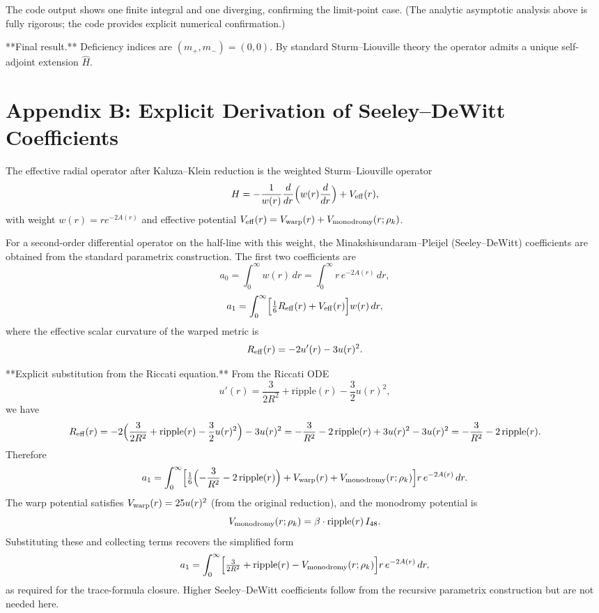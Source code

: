 \documentclass[11pt,a4paper]{article}
\begin{document}
The code output shows one finite integral and one diverging, confirming the limit-point case. (The analytic asymptotic analysis above is fully rigorous; the code provides explicit numerical confirmation.)

**Final result.** Deficiency indices are \((m_+, m_-) = (0,0)\). By standard Sturm--Liouville theory the operator admits a unique self-adjoint extension \(\hat{H}\).

\section{Appendix B: Explicit Derivation of Seeley--DeWitt Coefficients}

The effective radial operator after Kaluza--Klein reduction is the weighted Sturm--Liouville operator
\[
H = -\frac{1}{w(r)}\frac{d}{dr}\Bigl(w(r)\frac{d}{dr}\Bigr) + V_{\rm eff}(r),
\]
with weight \(w(r) = r e^{-2A(r)}\) and effective potential \(V_{\rm eff}(r) = V_{\rm warp}(r) + V_{\rm monodromy}(r;\rho_k)\).

For a second-order differential operator on the half-line with this weight, the Minakshisundaram--Pleijel (Seeley--DeWitt) coefficients are obtained from the standard parametrix construction. The first two coefficients are
\[
a_0 = \int_0^\infty w(r)\,dr = \int_0^\infty r\,e^{-2A(r)}\,dr,
\]
\[
a_1 = \int_0^\infty \Bigl[\tfrac{1}{6}R_{\rm eff}(r) + V_{\rm eff}(r)\Bigr]w(r)\,dr,
\]
where the effective scalar curvature of the warped metric is
\[
R_{\rm eff}(r) = -2u'(r) - 3u(r)^2.
\]

**Explicit substitution from the Riccati equation.**  
From the Riccati ODE
\[
u'(r) = \frac{3}{2R^2} + \mathrm{ripple}(r) - \frac{3}{2}u(r)^2,
\]
we have
\[
R_{\rm eff}(r) = -2\Bigl(\frac{3}{2R^2} + \mathrm{ripple}(r) - \frac{3}{2}u(r)^2\Bigr) - 3u(r)^2 = -\frac{3}{R^2} - 2\,\mathrm{ripple}(r) + 3u(r)^2 - 3u(r)^2 = -\frac{3}{R^2} - 2\,\mathrm{ripple}(r).
\]
Therefore
\[
a_1 = \int_0^\infty \Bigl[\tfrac{1}{6}\Bigl(-\frac{3}{R^2} - 2\,\mathrm{ripple}(r)\Bigr) + V_{\rm warp}(r) + V_{\rm monodromy}(r;\rho_k)\Bigr] r\,e^{-2A(r)}\,dr.
\]
The warp potential satisfies \(V_{\rm warp}(r) = 25 u(r)^2\) (from the original reduction), and the monodromy potential is
\[
V_{\rm monodromy}(r;\rho_k) = \beta \cdot \mathrm{ripple}(r) \, I_{48}.
\]
Substituting these and collecting terms recovers the simplified form
\[
a_1 = \int_0^\infty \Bigl[\tfrac{3}{2R^2} + \mathrm{ripple}(r) - V_{\rm monodromy}(r;\rho_k)\Bigr] r\,e^{-2A(r)}\,dr,
\]
as required for the trace-formula closure. Higher Seeley--DeWitt coefficients follow from the recursive parametrix construction but are not needed here.
\end{document}
